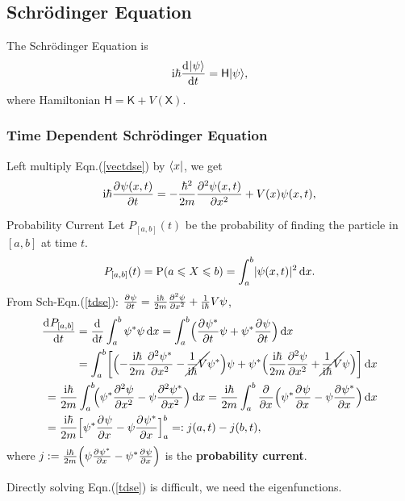 \documentclass{article}
\newcommand*{\op}[1]{\mathsf{#1}}
\newcommand{\ko}[1]{\hspace{-#1 pt}}
\newcommand{\spark}[1]{\textcolor{red}{#1}}
\begin{document}
\subsection{Schrödinger Equation}
The Schrödinger Equation is
\spark{\begin{align}\label{vectdse}
		\i\hbar\dv{\ket\psi}t=\op{H}\ket\psi,
	\end{align}}
where Hamiltonian $\op{H}=\op{K}+V(\op{X})$.
\subsubsection{Time Dependent Schrödinger Equation}
Left multiply Eqn.(\ref{vectdse}) by $\bra x$, we get
\begin{align}\label{tdse}
	\i\hbar\pv{\psi(x,t)}t=-\frac{\hbar^2}{2m}\pv[2]{\psi(x,t)}x+V(x)\psi(x,t),
\end{align}
\begin{definition}{Probability Current}{}
	Let $P_{[a,b]}(t)$ be the probability of finding the particle in $[a,b]$ at time $t$.
	$$P_{[a,b]}(t)=\P(a\leqslant X\leqslant b)=\int_a^b\abs{\psi(x,t)}^2\d x.$$
	From Sch-Eqn.(\ref{tdse}): $\pv\psi{t}=\frac{\i\hbar}{2m}\pv[2]\psi{x}+\frac1{\i\hbar}V\psi$,
	\begin{align*}
		\begin{aligned}
			\dv{P_{[a,b]}}t & =\dd t\int_a^b\psi\conj\psi\d x=\int_a^b\Bigp{\pv{\psi\conj}t\psi+\psi\conj\pv\psi{t}}\d x                                                                                        \\
			        & =\int_a^b\biggb{\Bigp{-\frac{\i\hbar}{2m}\pv[2]{\psi\conj}x-\cancel{\ko1\frac1{\i\hbar}V}\psi\conj}\psi+\psi\conj\Bigp{\frac{\i\hbar}{2m}\pv[2]\psi{x}+\ko1\cancel{\frac1{\i\hbar}V}\psi}}\d x
		\end{aligned} \\
		\begin{aligned}
			 & =\frac{\i\hbar}{2m}\int_a^b\ko2\Bigp{\psi\conj\pv[2]\psi{x}-\psi\pv[2]{\psi\conj}x}\d x=\frac{\i\hbar}{2m}\int_a^b\pp x\Bigp{\psi\conj\pv\psi{x}-\psi\pv{\psi\conj}x}\d x \\
			 & =\frac{\i\hbar}{2m}\Bigb{\psi\conj\pv\psi{x}-\psi\pv{\psi\conj}x}_a^b=:j(a,t)-j(b,t),
		\end{aligned}
	\end{align*}
	where $j:=\frac{\i\hbar}{2m}\Bigp{\psi\pv{\psi\conj}x-\psi\conj\pv{\psi}x}$ is the \textbf{probability current}.
\end{definition}
Directly solving Eqn.(\ref{tdse}) is difficult, we need the eigenfunctions.
\end{document}
